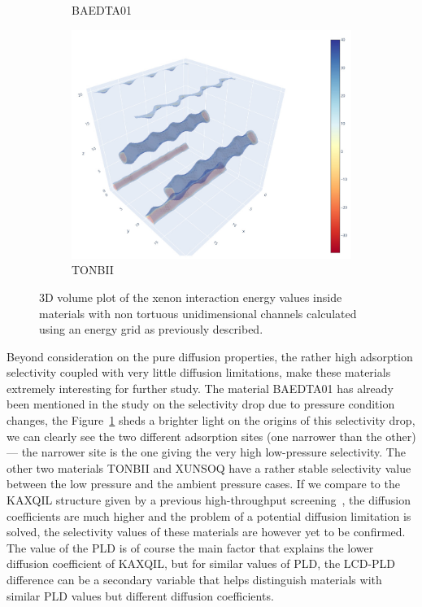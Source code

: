 \documentclass[main]{subfiles}
\begin{document}
\begin{figure}[ht]
\begin{subfigure}[b]{0.3\textwidth}
      \caption{BAEDTA01~\cite{Chen_2010}}\label{fgr:tube_cavities_b}
  \end{subfigure}
  \hfill
  \begin{subfigure}[b]{0.3\textwidth}
      \centering
      \includegraphics[width=\textwidth]{figures/5-diffusion/viz/TONBII.jpg}
      \caption{TONBII~\cite{Du_2010}}\label{fgr:tube_cavities_c}
  \end{subfigure}
     \caption{ 3D volume plot of the xenon interaction energy values inside materials with non tortuous unidimensional channels calculated using an energy grid as previously described.}\label{fgr:tube_cavities}
\end{figure}

Beyond consideration on the pure diffusion properties, the rather high adsorption selectivity coupled with very little diffusion limitations, make these materials extremely interesting for further study. The material BAEDTA01 has already been mentioned in the study on the selectivity drop due to pressure condition changes, the Figure~\ref{fgr:tube_cavities_b} sheds a brighter light on the origins of this selectivity drop, we can clearly see the two different adsorption sites (one narrower than the other) --- the narrower site is the one giving the very high low-pressure selectivity. The other two materials TONBII and XUNSOQ have a rather stable selectivity value between the low pressure and the ambient pressure cases. If we compare to the KAXQIL structure given by a previous high-throughput screening~\autocite{Simon_2015}, the diffusion coefficients are much higher and the problem of a potential diffusion limitation is solved, the selectivity values of these materials are however yet to be confirmed. The value of the PLD is of course the main factor that explains the lower diffusion coefficient of KAXQIL, but for similar values of PLD, the LCD-PLD difference can be a secondary variable that helps distinguish materials with similar PLD values but different diffusion coefficients. 
\end{document}
